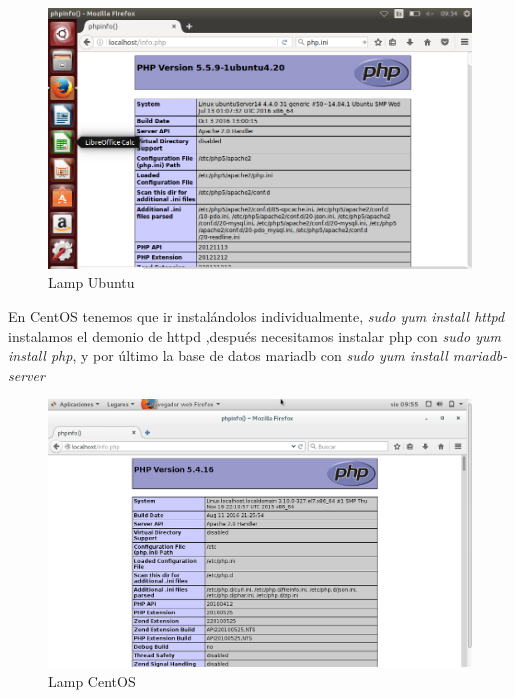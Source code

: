 	\begin{figure}[H]
	\centering
	\includegraphics[scale=0.35]{pics/lamp.png}  
	\caption{Lamp Ubuntu} \label{fig:lamp}
	\end{figure}




En CentOS tenemos que ir instalándolos individualmente, \textit{sudo yum install httpd} instalamos el demonio de httpd ,después necesitamos instalar php con \textit{sudo yum install php}, y por último la base de datos mariadb con \textit{sudo yum install mariadb-server}

	\begin{figure}[H]
	\centering
	\includegraphics[scale=0.35]{pics/lamp_centos.png} 
	\caption{Lamp CentOS} \label{fig:lamp_cen}
	\end{figure}

